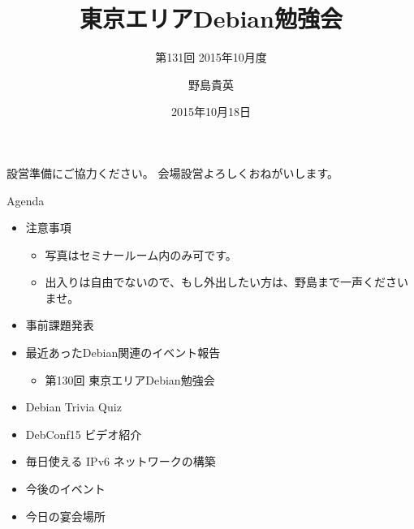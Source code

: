 \title{東京エリアDebian勉強会}
\subtitle{第131回 2015年10月度}
\author{野島貴英}
\date{2015年10月18日}



\begin{frame}
\titlepage{}
\end{frame}

\begin{frame}{設営準備にご協力ください。}
会場設営よろしくおねがいします。
\end{frame}

\begin{frame}{Agenda}
 \begin{minipage}[t]{0.45\hsize}
  \begin{itemize}
   \item 注意事項
	 \begin{itemize}
	  \item 写真はセミナールーム内のみ可です。
          \item 出入りは自由でないので、もし外出したい方は、野島まで一声くださいませ。
	 \end{itemize}
   \item 事前課題発表
  \end{itemize}
 \end{minipage} 
 \begin{minipage}[t]{0.45\hsize}
  \begin{itemize}
   \item 最近あったDebian関連のイベント報告
	 \begin{itemize}
	 \item 第130回 東京エリアDebian勉強会
	 \end{itemize}
   \item Debian Trivia Quiz
   \item DebConf15 ビデオ紹介
   \item 毎日使える IPv6 ネットワークの構築
   \item 今後のイベント
   \item 今日の宴会場所
  \end{itemize}
 \end{minipage}
\end{frame}

